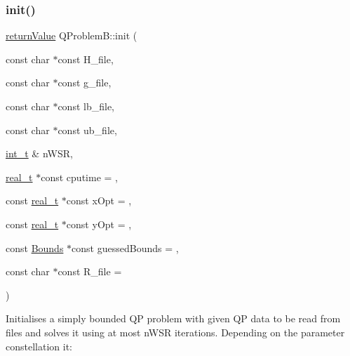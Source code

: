 \subsubsection{\texorpdfstring{init()}{init()}\hspace{0.1cm}{\footnotesize\ttfamily [3/3]}}
{\footnotesize\ttfamily \hyperlink{_message_handling_8hpp_a81d556f613bfbabd0b1f9488c0fa865e}{return\+Value} Q\+Problem\+B\+::init (\begin{DoxyParamCaption}\item[{const char $\ast$const}]{H\+\_\+file,  }\item[{const char $\ast$const}]{g\+\_\+file,  }\item[{const char $\ast$const}]{lb\+\_\+file,  }\item[{const char $\ast$const}]{ub\+\_\+file,  }\item[{\hyperlink{_types_8hpp_ab6fd6105e64ed14a0c9281326f05e623}{int\+\_\+t} \&}]{n\+W\+SR,  }\item[{\hyperlink{qp_o_a_s_e_s__wrapper_8h_a0d00e2b3dfadee81331bbb39068570c4}{real\+\_\+t} $\ast$const}]{cputime = {},  }\item[{const \hyperlink{qp_o_a_s_e_s__wrapper_8h_a0d00e2b3dfadee81331bbb39068570c4}{real\+\_\+t} $\ast$const}]{x\+Opt = {},  }\item[{const \hyperlink{qp_o_a_s_e_s__wrapper_8h_a0d00e2b3dfadee81331bbb39068570c4}{real\+\_\+t} $\ast$const}]{y\+Opt = {},  }\item[{const \hyperlink{class_bounds}{Bounds} $\ast$const}]{guessed\+Bounds = {},  }\item[{const char $\ast$const}]{R\+\_\+file = {} }\end{DoxyParamCaption})}

Initialises a simply bounded QP problem with given QP data to be read from files and solves it using at most n\+W\+SR iterations. Depending on the parameter constellation it\+: ~\newline

